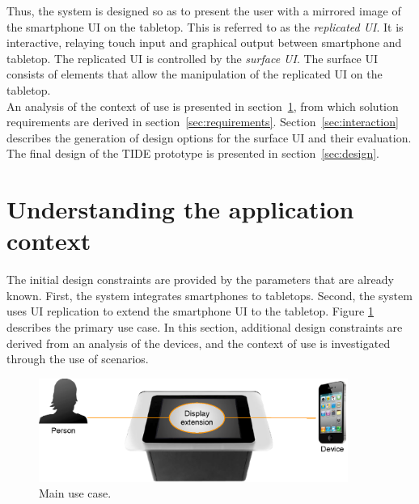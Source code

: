 Thus, the system is designed so as to present the user with a mirrored image of the smartphone UI on the tabletop.
This is referred to as the \emph{replicated UI}.
It is interactive, relaying touch input and graphical output between smartphone and tabletop.
The replicated UI is controlled by the \emph{surface UI}.
The surface UI consists of elements that allow the manipulation of the replicated UI on the tabletop.
\\
\linebreak
An analysis of the context of use is presented in section~\ref{sec:context}, from which solution requirements are derived in section~\ref{sec:requirements}.
Section~\ref{sec:interaction} describes the generation of design options for the surface UI and their evaluation.
The final design of the TIDE prototype is presented in section~\ref{sec:design}.

\section{Understanding the application context}
\label{sec:context}

The initial design constraints are provided by the parameters that are already known.
First, the system integrates smartphones to tabletops.
Second, the system uses UI replication to extend the smartphone UI to the tabletop.
Figure \ref{fig:useCase} describes the primary use case.
In this section, additional design constraints are derived from an analysis of the devices, and the context of use is investigated through the use of scenarios.

\begin{figure}[htb]
  \centering
    \includegraphics[width=0.9\textwidth]{images/useCase}
    \caption{Main use case.}
    \label{fig:useCase}
\end{figure}


